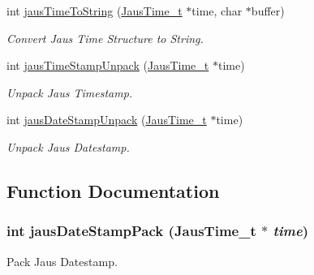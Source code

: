 \begin{CompactItemize}
int \hyperlink{group__time__conv_g0e70191e4545f9180f005c013a8573a0}{jausTimeToString} (\hyperlink{structJausTime__t}{JausTime\_\-t} $\ast$time, char $\ast$buffer)
\begin{CompactList}\small\item\em Convert Jaus Time Structure to String. \item\end{CompactList}\item 
int \hyperlink{group__time__conv_g32861ee818838c146b1a50bd18a1b443}{jausTimeStampUnpack} (\hyperlink{structJausTime__t}{JausTime\_\-t} $\ast$time)
\begin{CompactList}\small\item\em Unpack Jaus Timestamp. \item\end{CompactList}\item 
int \hyperlink{group__time__conv_ga8c0786a64ecb030207a9153aa8cd624}{jausDateStampUnpack} (\hyperlink{structJausTime__t}{JausTime\_\-t} $\ast$time)
\begin{CompactList}\small\item\em Unpack Jaus Datestamp. \item\end{CompactList}\end{CompactItemize}


\subsection{Function Documentation}
\hypertarget{group__time__conv_g8c18bc24bd1c4d704a2e475a95649dbc}{
\subsubsection[jausDateStampPack]{\setlength{\rightskip}{0pt plus 5cm}int jausDateStampPack ({\bf JausTime\_\-t} $\ast$ {\em time})}}
\label{group__time__conv_g8c18bc24bd1c4d704a2e475a95649dbc}


Pack Jaus Datestamp. 

